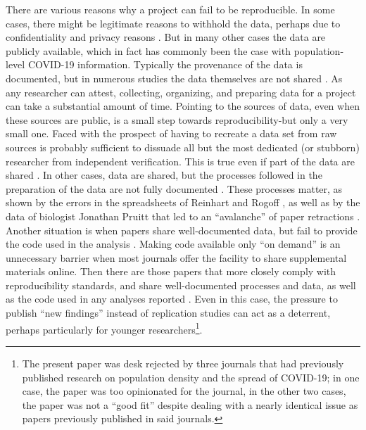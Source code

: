 \documentclass[preprint, 3p,
authoryear]{elsarticle} %
\begin{document}
There are various reasons why a project can fail to be reproducible. In
some cases, there might be legitimate reasons to withhold the data,
perhaps due to confidentiality and privacy reasons
\citep[e.g.,][]{Lee2020human}. But in many other cases the data are
publicly available, which in fact has commonly been the case with
population-level COVID-19 information. Typically the provenance of the
data is documented, but in numerous studies the data themselves are not
shared
\citep{Amadu2021assessing, Bhadra2021impact, Cruz2020exploring, Feng2020spread, Fielding2020social, Hamidi2020longitudinal, Hamidi2020density, Inbaraj2021seroprevalence, Souris2020covid}.
As any researcher can attest, collecting, organizing, and preparing data
for a project can take a substantial amount of time. Pointing to the
sources of data, even when these sources are public, is a small step
towards reproducibility-but only a very small one. Faced with the
prospect of having to recreate a data set from raw sources is probably
sufficient to dissuade all but the most dedicated (or stubborn)
researcher from independent verification. This is true even if part of
the data are shared \citep[e.g.,][]{Wong2020spreading}. In other cases,
data are shared, but the processes followed in the preparation of the
data are not fully documented
\citep{Ahmad2020association, Skorka2020macroecology}. These processes
matter, as shown by the errors in the spreadsheets of Reinhart and
Rogoff \citep[see][ for the discovery of these errors]{Herndon2014high},
as well as by the data of biologist Jonathan Pruitt that led to an
``avalanche'' of paper retractions \citep[see][]{Viglione2020avalanche}.
Another situation is when papers share well-documented data, but fail to
provide the code used in the analysis
\citep{Noury2021how, Pequeno2020air, Wang2021transmission}. Making code
available only ``on demand'' \citep[e.g.,][]{Brandtner2021creatures} is
an unnecessary barrier when most journals offer the facility to share
supplemental materials online. Then there are those papers that more
closely comply with reproducibility standards, and share well-documented
processes and data, as well as the code used in any analyses reported
\citep{Paez2020spatio, Feyman2020effectiveness, Stephens2021impact, White2020state, Sy2021population}.
Even in this case, the pressure to publish ``new findings'' instead of
replication studies can act as a deterrent, perhaps particularly for
younger researchers\footnote{The present paper was desk rejected by
  three journals that had previously published research on population
  density and the spread of COVID-19; in one case, the paper was too
  opinionated for the journal, in the other two cases, the paper was not
  a ``good fit'' despite dealing with a nearly identical issue as papers
  previously published in said journals.}.
\end{document}
